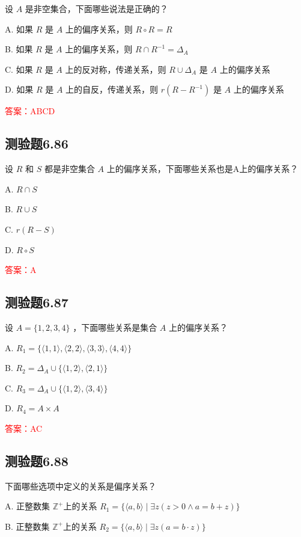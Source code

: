 \documentclass[UTF8, heading=true]{ctexart}
\begin{document}
设 $A$ 是非空集合，下面哪些说法是正确的？

A. 如果 $R$ 是 $A$ 上的偏序关系，则 $R \circ R=R$

B. 如果 $R$ 是 $A$ 上的偏序关系，则 $R \cap R^{-1}=\Delta_A$

C. 如果 $R$ 是 $A$ 上的反对称，传递关系，则 $R \cup \Delta_A$ 是 $A$ 上的偏序关系

D. 如果 $R$ 是 $A$ 上的自反，传递关系，则 $r\left(R-R^{-1}\right)$ 是 $A$ 上的偏序关系


\textcolor{red}{答案：ABCD}


\subsection{测验题6.86}

设 $R$ 和 $S$ 都是非空集合 $A$ 上的偏序关系，下面哪些关系也是A上的偏序关系？

A. $R \cap S$

B. $R \cup S$

C. $r(R-S)$

D. $R \circ S$

\textcolor{red}{答案：A}


\subsection{测验题6.87}

设 $A=\{1,2,3,4\}$ ，下面哪些关系是集合 $A$ 上的偏序关系？


A. $
R_1=\{\langle 1,1\rangle,\langle 2,2\rangle,\langle 3,3\rangle,\langle 4,4\rangle\}
$

B. $R_2=\Delta_A \cup\{\langle 1,2\rangle,\langle 2,1\rangle\}$

C. $R_3=\Delta_A \cup\{\langle 1,2\rangle,\langle 3,4\rangle\}$

D. $R_4=A \times A$

\textcolor{red}{答案：AC}

\subsection{测验题6.88}

下面哪些选项中定义的关系是偏序关系？

A. 正整数集 $\mathbb{Z}^{+}$上的关系 $R_1=\{\langle a, b\rangle \mid \exists z(z>0 \wedge a=b+z)\}$

B. 正整数集 $\mathbb{Z}^{+}$上的关系 $R_2=\{\langle a, b\rangle \mid \exists z(a=b \cdot z)\}$
\end{document}
